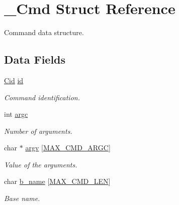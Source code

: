 \hypertarget{struct__Cmd}{}\section{\+\_\+\+Cmd Struct Reference}
\label{struct__Cmd}


Command data structure.  


\subsection*{Data Fields}
\begin{DoxyCompactItemize}
\item 
\mbox{\label{struct__Cmd_a106b2045967078710623e3a5f401dde2}} 
\hyperlink{cmd_8h_a2933336e1f8003400f3b050402f0f5f3}{Cid} \hyperlink{struct__Cmd_a106b2045967078710623e3a5f401dde2}{id}
\begin{DoxyCompactList}\small\item\em Command identification. \end{DoxyCompactList}\item 
\mbox{\label{struct__Cmd_af56ffa5c8c8f19251b15dc02a7eb352d}} 
int \hyperlink{struct__Cmd_af56ffa5c8c8f19251b15dc02a7eb352d}{argc}
\begin{DoxyCompactList}\small\item\em Number of arguments. \end{DoxyCompactList}\item 
\mbox{\label{struct__Cmd_aaaa6f539ab5219743163ecb74138fe7a}} 
char $\ast$ \hyperlink{struct__Cmd_aaaa6f539ab5219743163ecb74138fe7a}{argv} \mbox{[}\hyperlink{cmd_8h_a64bf1979142baf43271722ff7b14c17d}{M\+A\+X\+\_\+\+C\+M\+D\+\_\+\+A\+R\+GC}\mbox{]}
\begin{DoxyCompactList}\small\item\em Value of the arguments. \end{DoxyCompactList}\item 
\mbox{\label{struct__Cmd_adb97870a775bf9f9075d44420cb82439}} 
char \hyperlink{struct__Cmd_adb97870a775bf9f9075d44420cb82439}{b\+\_\+name} \mbox{[}\hyperlink{cmd_8h_a1eb73c104b484cf18752169509cebfe2}{M\+A\+X\+\_\+\+C\+M\+D\+\_\+\+L\+EN}\mbox{]}
\begin{DoxyCompactList}\small\item\em Base name. \end{DoxyCompactList}\item 

\end{DoxyCompactItemize}
